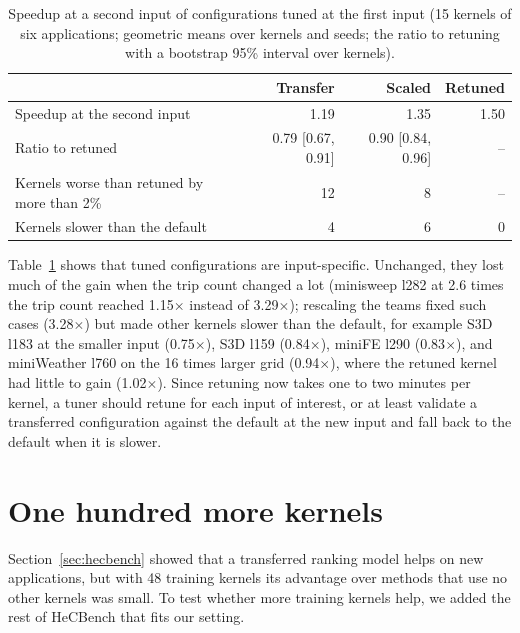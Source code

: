 \documentclass[10pt]{article}
\newcommand{\x}{\ensuremath{\times}}
\begin{document}
\begin{table}[t]
\centering
\caption{Speedup at a second input of configurations tuned at the first input
(15 kernels of six applications; geometric means over kernels and seeds; the
ratio to retuning with a bootstrap 95\% interval over kernels).}
\label{tab:inputs}
\small
\begin{tabular}{lrrr}
\toprule
& Transfer & Scaled & Retuned \\
\midrule
Speedup at the second input & 1.19 & 1.35 & 1.50 \\
Ratio to retuned & 0.79 [0.67, 0.91] & 0.90 [0.84, 0.96] & -- \\
Kernels worse than retuned by more than 2\% & 12 & 8 & -- \\
Kernels slower than the default & 4 & 6 & 0 \\
\bottomrule
\end{tabular}
\end{table}

Table~\ref{tab:inputs} shows that tuned configurations are input-specific.
Unchanged, they lost much of the gain when the trip count changed a lot (minisweep
l282 at 2.6 times the trip count reached 1.15\x{} instead of 3.29\x{}); rescaling
the teams fixed such cases (3.28\x{}) but made other kernels slower than the
default, for example S3D l183 at the smaller input (0.75\x{}), S3D l159 (0.84\x{}),
miniFE l290 (0.83\x{}), and miniWeather l760 on the 16 times larger grid (0.94\x{}),
where the retuned kernel had little to gain (1.02\x{}). Since retuning now takes
one to two minutes per kernel, a tuner should retune for each input of interest,
or at least validate a transferred configuration against the default at the new
input and fall back to the default when it is slower.

\section{One hundred more kernels}
\label{sec:more}
Section~\ref{sec:hecbench} showed that a transferred ranking model helps on new
applications, but with 48 training kernels its advantage over methods that use
no other kernels was small. To test whether more training kernels help, we
added the rest of HeCBench that fits our setting.
\end{document}
